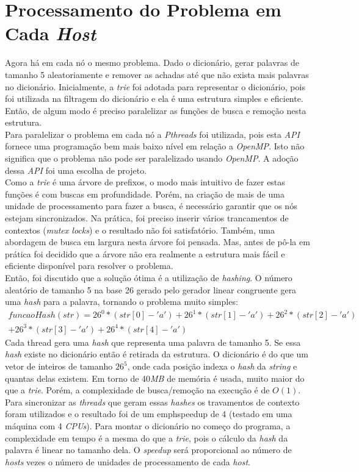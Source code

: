 \documentclass[a4paper]{article}
\begin{document}
\section{Processamento do Problema em Cada \emph{Host}}
\indent \indent Agora há em cada nó o mesmo problema. Dado o dicionário, gerar palavras de tamanho 5 aleatoriamente e remover as achadas até que não exista mais palavras no dicionário. Inicialmente, a \emph{trie} foi adotada para representar o dicionário, pois foi utilizada na filtragem do dicionário e ela é uma estrutura simples e eficiente. Então, de algum modo é preciso paralelizar as funções de busca e remoção nesta estrutura.\\
\indent Para paralelizar o problema em cada nó a \emph{Pthreads} foi utilizada, pois esta \emph{API} fornece uma programação bem mais baixo nível em relação a \emph{OpenMP}. Isto não significa que o problema não pode ser paralelizado usando \emph{OpenMP}. A adoção dessa \emph{API} foi uma escolha de projeto.\\
\indent Como a \emph{trie} é uma árvore de prefixos, o modo mais intuitivo de fazer estas funções é com buscas em profundidade. Porém, na criação de mais de uma unidade de processamento para fazer a busca, é necessário garantir que os nós estejam sincronizados. Na prática, foi preciso inserir vários trancamentos de contextos (\emph{mutex locks}) e o resultado não foi satisfatório. Também, uma abordagem de busca em largura nesta árvore foi pensada. Mas, antes de pô-la em prática foi decidido que a árvore não era realmente a estrutura mais fácil e eficiente disponível para resolver o problema.\\
\indent Então, foi discutido que a solução ótima é a utilização de \emph{hashing}. O número aleatório de tamanho 5 na base 26 gerado pelo gerador linear congruente gera uma \emph{hash} para a palavra, tornando o problema muito simples:
\begin{eqnarray*}
	funcaoHash(str) = 26^0*(str[0] - 'a') + 26^1*(str[1] - 'a') + 26^2*(str[2] - 'a')\\
	+ 26^3*(str[3] - 'a') + 26^4*(str[4] - 'a')
\end{eqnarray*}
\indent Cada thread gera uma \emph{hash} que representa uma palavra de tamanho 5. Se essa \emph{hash} existe no dicionário então é retirada da estrutura. O dicionário é do que um vetor de inteiros de tamanho \begin{math}26^5\end{math}, onde cada posição indexa o \emph{hash} da \emph{string} e quantas delas existem. Em torno de 40\emph{MB} de memória é usada, muito maior do que a \emph{trie}. Porém, a complexidade de busca/remoção na execução é de \begin{math}O(1)\end{math}. Para sincronizar as \emph{threads} que geram essas \emph{hashes} os travamentos de contexto foram utilizados e o resultado foi de um emph{speedup} de 4 (testado em uma máquina com 4 \emph{CPUs}). Para montar o dicionário no começo do programa, a complexidade em tempo é a mesma do que a \emph{trie}, pois o cálculo da \emph{hash} da palavra é linear no tamanho dela. O \emph{speedup} será proporcional ao número de \emph{hosts} vezes o número de unidades de processamento de cada \emph{host}.
\end{document}
